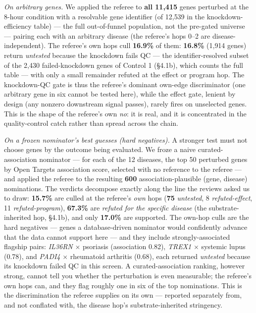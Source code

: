 \emph{On arbitrary genes.} We applied the referee to \textbf{all 11,415} genes perturbed at the 8-hour
condition with a resolvable gene identifier (of 12{,}539 in the knockdown-efficiency table) --- the full
out-of-funnel population, not the pre-gated universe --- pairing each with an arbitrary
disease (the referee's hops 0--2 are disease-independent). The referee's own hops cull \textbf{16.9\%} of
them: \textbf{16.8\%} (1{,}914 genes) return \emph{untested} because the knockdown fails QC --- the
identifier-resolved subset of the 2{,}430 failed-knockdown genes of Control 1 (\S{}4.1b), which counts the
full table --- with only a small remainder refuted at the effect or program hop. The
knockdown-QC gate is thus the referee's dominant own-edge discriminator (one arbitrary gene in six cannot be
tested here), while the effect gate, lenient by design (any nonzero downstream signal passes), rarely fires
on unselected genes. This is the shape of the referee's own \emph{no}: it is real, and it is
concentrated in the quality-control catch rather than spread across the chain.

\emph{On a frozen nominator's best guesses (hard negatives).} A stronger test must not choose genes by the
outcome being evaluated. We froze a naive curated-association nominator --- for each of the 12 diseases, the
top 50 perturbed genes by Open Targets association score, selected with no reference to the referee --- and
applied the referee to the resulting \textbf{600} association-plausible (gene, disease) nominations. The
verdicts decompose exactly along the line the reviews asked us to draw: \textbf{15.7\%} are culled at the
referee's \emph{own} hops (\textbf{75} \emph{untested}, 8 \emph{refuted-effect}, 11 \emph{refuted-program}),
\textbf{67.3\%} are \emph{refuted for the specific disease} (the substrate-inherited hop, \S{}4.1b), and only
\textbf{17.0\%} are supported. The own-hop culls are the hard negatives --- genes a database-driven nominator
would confidently advance that the data cannot support here --- and they include strongly-associated flagship
pairs: \emph{IL36RN} $\times$ psoriasis (association 0.82), \emph{TREX1} $\times$ systemic lupus (0.78), and
\emph{PADI4} $\times$ rheumatoid arthritis (0.68), each returned \emph{untested} because its knockdown failed
QC in this screen. A curated-association ranking, however strong, cannot tell you whether the perturbation is
even measurable; the referee's own hops can, and they flag roughly one in six of the top nominations. This is
the discrimination the referee supplies on its own --- reported separately from, and not conflated with, the
disease hop's substrate-inherited stringency.

